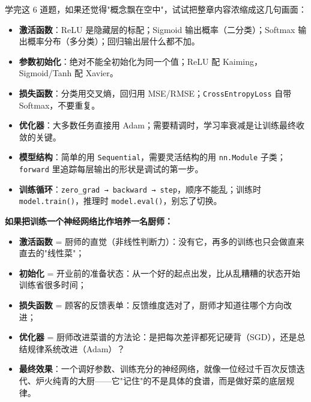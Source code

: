 \documentclass[a4paper,11pt]{ctexart}
\begin{document}
学完这 6 道题，如果还觉得"概念飘在空中"，试试把整章内容浓缩成这几句画面：

\begin{itemize}
    \item \textbf{激活函数}：ReLU 是隐藏层的标配；Sigmoid 输出概率（二分类）；Softmax 输出概率分布（多分类）；回归输出层什么都不加。
    \item \textbf{参数初始化}：绝对不能全初始化为同一个值；ReLU 配 Kaiming，Sigmoid/Tanh 配 Xavier。
    \item \textbf{损失函数}：分类用交叉熵，回归用 MSE/RMSE；\texttt{CrossEntropyLoss} 自带 Softmax，不要重复。
    \item \textbf{优化器}：大多数任务直接用 Adam；需要精调时，学习率衰减是让训练最终收敛的关键。
    \item \textbf{模型结构}：简单的用 \texttt{Sequential}，需要灵活结构的用 \texttt{nn.Module} 子类；\texttt{forward} 里追踪每层输出的形状是调试的第一步。
    \item \textbf{训练循环}：\texttt{zero\_grad → backward → step}，顺序不能乱；训练时 \texttt{model.train()}，推理时 \texttt{model.eval()}，别忘了切换。
\end{itemize}

\begin{metaphorbox}[给零基础读者的一句总比喻]
    \textbf{如果把训练一个神经网络比作培养一名厨师：}
    \begin{itemize}
        \item \textbf{激活函数} = 厨师的直觉（非线性判断力）：没有它，再多的训练也只会做直来直去的"线性菜"；
        \item \textbf{初始化} = 开业前的准备状态：从一个好的起点出发，比从乱糟糟的状态开始训练省很多时间；
        \item \textbf{损失函数} = 顾客的反馈表单：反馈维度选对了，厨师才知道往哪个方向改进；
        \item \textbf{优化器} = 厨师改进菜谱的方法论：是把每次差评都死记硬背（SGD），还是总结规律系统改进（Adam）？
        \item \textbf{最终效果}：一个调好参数、训练充分的神经网络，就像一位经过千百次反馈迭代、炉火纯青的大厨——它"记住"的不是具体的食谱，而是做好菜的底层规律。
    \end{itemize}
\end{metaphorbox}
\end{document}
